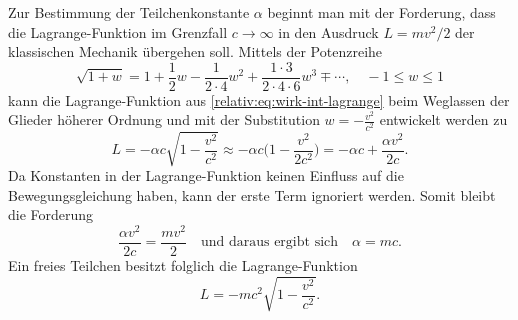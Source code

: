 Zur Bestimmung der Teilchenkonstante \(\alpha\) beginnt man mit der Forderung,
dass die Lagrange-Funktion im Grenzfall \(c\rightarrow\infty\) in den
Ausdruck \(L=mv^2/2\) der klassischen Mechanik übergehen soll.
Mittels der Potenzreihe
\begin{equation*}
    \sqrt{1+w} = 1 + \frac{1}{2} w - \frac{1}{2\cdot4} w^2 +
    \frac{1\cdot3}{2\cdot4\cdot6} w^3 \mp \cdots, \quad
    -1\leq w \leq1
\end{equation*}
kann die Lagrange-Funktion aus
\eqref{relativ:eq:wirk-int-lagrange} beim Weglassen der
Glieder höherer Ordnung und mit der Substitution
\(w=-\frac{v^2}{c^2}\) entwickelt werden zu
\begin{equation}
    L = - \alpha c \sqrt{1-\frac{v^2}{c^2}}
    \approx -\alpha c \biggl(1 - \frac{v^2}{2c^2}\biggr)
    = -\alpha c + \frac{\alpha v^2}{2c}.
\end{equation}
Da Konstanten in der Lagrange-Funktion keinen Einfluss auf die Bewegungsgleichung haben,
kann der erste Term ignoriert werden. Somit bleibt die Forderung
\begin{equation}
    \frac{\alpha v^2}{2c} = \frac{mv^2}{2}
    \quad \text{und daraus ergibt sich} \quad
    \alpha = mc.
\end{equation}
Ein freies Teilchen besitzt folglich die Lagrange-Funktion
\begin{equation}
    L = -mc^2 \sqrt{1-\frac{v^2}{c^2}}.
\label{relativ:eqn:lagrange-freies-teilchen}
\end{equation}
